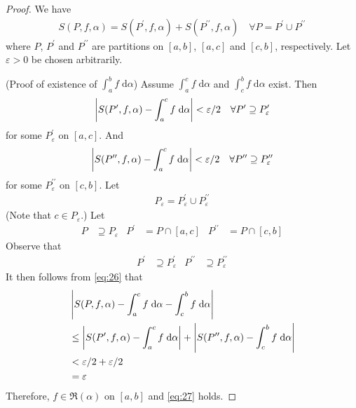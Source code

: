 \documentclass[thmcnt=section, 12pt]{my-elegantbook}
\begin{document}
\begin{proof}
    We have
    \begin{align}
        S(P,f,\alpha) = S(P^\prime, f, \alpha) + S(P^{\prime\prime}, f, \alpha)
        \quad
        \forall P = P^\prime \cup P^{\prime\prime}
        \label{eq:26}
    \end{align}
    where $P$, $P^\prime$ and $P^{\prime\prime}$ are partitions on $[a, b]$, $[a, c]$ and $[c, b]$, respectively. Let $\varepsilon > 0$ be chosen arbitrarily.

    \par (Proof of existence of $\int_a^b f \; \mathrm{d}\alpha$) Assume $\int_a^c f \; \mathrm{d}\alpha$ and $\int_c^b f \; \mathrm{d}\alpha$ exist. Then
    \begin{align*}
        \left\lvert S(P^\prime, f, \alpha) - \int_a^c f \; \mathrm{d}\alpha \right\rvert < \varepsilon / 2
        \quad \forall P^\prime \supseteq P_\varepsilon^\prime
    \end{align*}
    for some $P_\varepsilon^\prime$ on $[a, c]$. And
    \begin{align*}
        \left\lvert S(P^{\prime\prime}, f, \alpha) - \int_a^c f \; \mathrm{d}\alpha \right\rvert < \varepsilon / 2
        \quad \forall P^{\prime\prime} \supseteq P_\varepsilon^{\prime\prime}
    \end{align*}
    for some $P_\varepsilon^{\prime\prime}$ on $[c, b]$. Let
    \begin{align*}
        P_\varepsilon = P_\varepsilon^\prime \cup P_\varepsilon^{\prime\prime}
    \end{align*}
    (Note that $c \in P_\varepsilon$.) Let
    \begin{align*}
        P                & \supseteq P_\varepsilon &
        P^\prime         & = P \cap [a, c]         &
        P^{\prime\prime} & = P \cap [c, b]
    \end{align*}
    Observe that
    \begin{align*}
        P^\prime         & \supseteq P_\varepsilon^\prime         &
        P^{\prime\prime} & \supseteq P_\varepsilon^{\prime\prime}
    \end{align*}
    It then follows from \eqref{eq:26} that
    \begin{align*}
         & \left\lvert 
            S(P, f, \alpha)
            - \int_a^c f \; \mathrm{d}\alpha
            - \int_c^b f \; \mathrm{d}\alpha
         \right\rvert                                      \\
         & \leq \left\lvert 
            S(P^\prime, f, \alpha)
            - \int_a^c f \; \mathrm{d}\alpha
         \right\rvert + \left\lvert 
            S(P^{\prime\prime}, f, \alpha)
            - \int_c^b f \; \mathrm{d}\alpha
         \right\rvert                                      \\
         & < \varepsilon / 2 + \varepsilon / 2 \\
         & = \varepsilon
    \end{align*}
    Therefore, $f \in \mathfrak{R}(\alpha)$ on $[a, b]$ and \eqref{eq:27} holds.


\end{proof}
\end{document}

